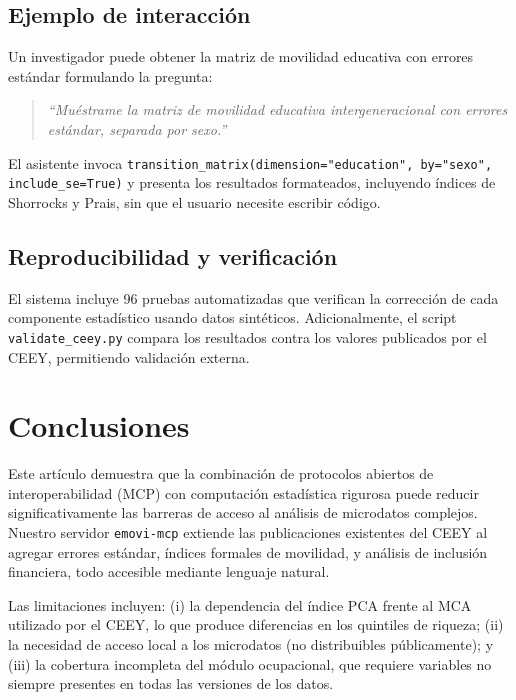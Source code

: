 \documentclass[12pt, a4paper]{article}
\begin{document}
\subsection{Ejemplo de interacción}

Un investigador puede obtener la matriz de movilidad educativa con errores estándar formulando la pregunta:

\begin{quote}
\textit{``Muéstrame la matriz de movilidad educativa intergeneracional con errores estándar, separada por sexo.''}
\end{quote}

El asistente invoca \texttt{transition\_matrix(dimension="education", by="sexo", include\_se=True)} y presenta los resultados formateados, incluyendo índices de Shorrocks y Prais, sin que el usuario necesite escribir código.

\subsection{Reproducibilidad y verificación}

El sistema incluye 96 pruebas automatizadas que verifican la corrección de cada componente estadístico usando datos sintéticos. Adicionalmente, el script \texttt{validate\_ceey.py} compara los resultados contra los valores publicados por el CEEY, permitiendo validación externa.


\section{Conclusiones}
\label{sec:conclusions}

Este artículo demuestra que la combinación de protocolos abiertos de interoperabilidad (MCP) con computación estadística rigurosa puede reducir significativamente las barreras de acceso al análisis de microdatos complejos. Nuestro servidor \texttt{emovi-mcp} extiende las publicaciones existentes del CEEY al agregar errores estándar, índices formales de movilidad, y análisis de inclusión financiera, todo accesible mediante lenguaje natural.

Las limitaciones incluyen: (i) la dependencia del índice PCA frente al MCA utilizado por el CEEY, lo que produce diferencias en los quintiles de riqueza; (ii) la necesidad de acceso local a los microdatos (no distribuibles públicamente); y (iii) la cobertura incompleta del módulo ocupacional, que requiere variables no siempre presentes en todas las versiones de los datos.
\end{document}

